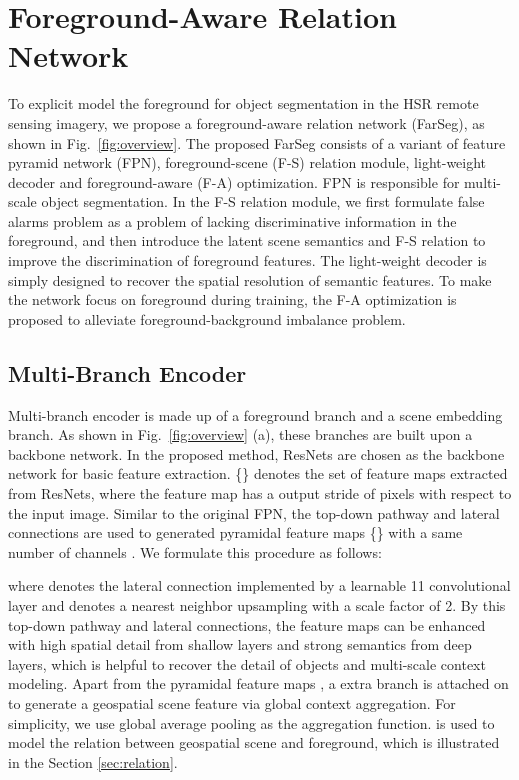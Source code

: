 \documentclass[10pt,twocolumn,letterpaper]{article}
\begin{document}
\section{Foreground-Aware Relation Network}
\label{sec:method}
To explicit model the foreground for object segmentation in the HSR remote sensing imagery, we propose a foreground-aware relation network (FarSeg), as shown in Fig.~\ref{fig:overview}.
The proposed FarSeg consists of a variant of feature pyramid network (FPN), foreground-scene (F-S) relation module, light-weight decoder and foreground-aware (F-A) optimization.
FPN is responsible for multi-scale object segmentation.
In the F-S relation module, we first formulate false alarms problem as a problem of lacking discriminative information in the foreground, and then introduce the latent scene semantics and F-S relation to improve the discrimination of foreground features.
The light-weight decoder is simply designed to recover the spatial resolution of semantic features.
To make the network focus on foreground during training, the F-A optimization is proposed to alleviate foreground-background imbalance problem.


\subsection{Multi-Branch Encoder}
Multi-branch encoder is made up of a foreground branch and a scene embedding branch.
As shown in Fig.~\ref{fig:overview} (a), these branches are built upon a backbone network.
In the proposed method, ResNets \cite{he2016deep} are chosen as the backbone network for basic feature extraction.
\{\} denotes the set of feature maps extracted from ResNets, where the feature map  has a output stride of  pixels with respect to the input image.
Similar to the original FPN, the top-down pathway and lateral connections are used to generated pyramidal feature maps \{\} with a same number of channels .
We formulate this procedure as follows:

where  denotes the lateral connection implemented by a learnable 11 convolutional layer and  denotes a nearest neighbor upsampling with a scale factor of 2.
By this top-down pathway and lateral connections, the feature maps can be enhanced with high spatial detail from shallow layers and strong semantics from deep layers, which is helpful to recover the detail of objects and multi-scale context modeling.
Apart from the pyramidal feature maps , a extra branch is attached on  to generate a geospatial scene feature  via global context aggregation.
For simplicity, we use global average pooling as the aggregation function.
 is used to model the relation between geospatial scene and foreground, which is illustrated in the Section \ref{sec:relation}.
\end{document}
